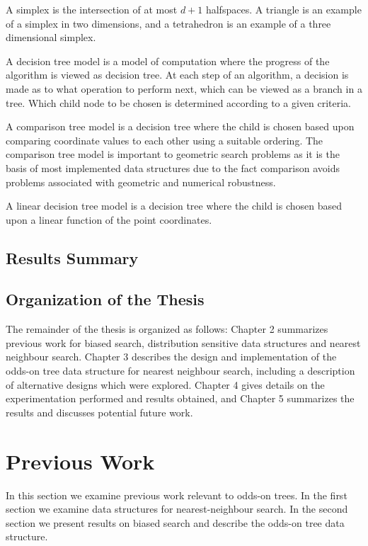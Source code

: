 \documentclass[mcs]{scsthesis}
\begin{document}
A simplex is the intersection of at most \(d + 1\) halfspaces. A triangle is an
example of a simplex in two dimensions, and a tetrahedron is an example of a
three dimensional simplex.

A decision tree model is a model of computation where the progress of the
algorithm is viewed as decision tree. At each step of an algorithm, a decision
is made as to what operation to perform next, which can be viewed as a branch
in a tree. Which child node to be chosen is determined according to a given
criteria.

A comparison tree model is a decision tree where the child is chosen based
upon comparing coordinate values to each other using a suitable ordering.
The comparison tree model is important to geometric search problems as it is
the basis of most implemented data structures due to the fact comparison
avoids problems associated with geometric and numerical robustness.

A linear decision tree model is a decision tree where the child is chosen based
upon a linear function of the point coordinates.

\section{Results Summary}


\section{Organization of the Thesis}

The remainder of the thesis is organized as follows: Chapter 2 summarizes
previous work for biased search, distribution sensitive data structures and
nearest neighbour search.  Chapter 3 describes the design and implementation of
the odds-on tree data structure for nearest neighbour search, including a
description of alternative designs which were explored. Chapter 4 gives details
on the experimentation performed and results obtained, and Chapter 5 summarizes
the results and discusses potential future work.

\chapter{Previous Work}

In this section we examine previous work relevant to odds-on trees. In the first
section we examine data structures for nearest-neighbour search. In the second
section we present results on biased search and describe the odds-on tree data
structure.
\end{document}
